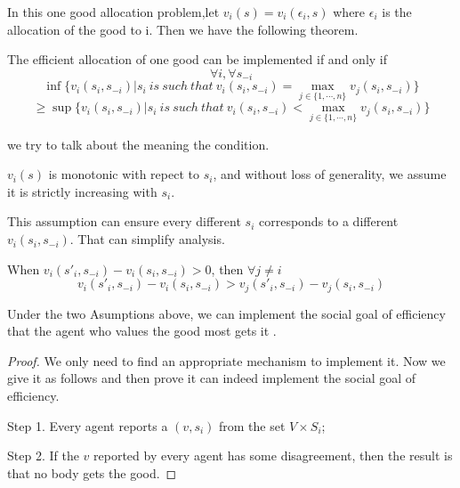 \begin{prop}
In this one good allocation problem,let $v_i(s)=v_i(\epsilon_i,s)$ where $\epsilon_i$ is the allocation of the good to i. Then we
have the following theorem.
\begin{corollary}[of Theorem 1]
The efficient allocation of one good can be implemented  
if and only if 
 $$\forall i,\forall s_{-i}$$
 $$ \inf \{v_i(s_i, s_{-i})|s_i\ is \ such \ that\ v_i(s_i, s_{-i}) = \max_{j\in\{1,\cdots,n\}}v_j(s_i, s_{-i}) \}$$
 $$\geqslant \sup \{v_i(s_i, s_{-i})|s_i\ is \ such \ that\ v_i(s_i, s_{-i}) < \max_{j\in\{1,\cdots,n\}}v_j(s_i, s_{-i}) \}$$

\end{corollary}
 we try to talk about the meaning the condition.


\begin{assumption}
 $v_i(s)$ is  monotonic with repect to $s_i$, and without loss of generality, we assume it is strictly increasing with $s_i$.
\end{assumption}
This assumption can ensure every different $s_i$ corresponds to a different $v_i(s_i, s_{-i})$. That can simplify analysis. 

\begin{assumption}
When $v_i(s'_i, s_{-i})-v_i(s_i,s_{-i})>0$, then $\forall j\neq i$
$$v_i(s'_i, s_{-i})-v_i(s_i,s_{-i})>v_j(s'_i, s_{-i})-v_j(s_i,s_{-i}) $$
 
\end{assumption}



\begin{prop}
 Under the two Asumptions above, we can implement the social goal of efficiency that the agent who values the good most gets it .
\end{prop}

\begin{proof}
 We only need to find an appropriate mechanism to implement it. Now we give it as follows and then prove it can indeed
 implement the social goal of efficiency.
 
 Step 1. Every agent reports a $(v,s_i)$ from the set $V\times S_i$;
 
 Step 2. If the $v$ reported by every agent has some disagreement, then the result is that no body gets the good.
 

\end{proof}
\end{prop}
